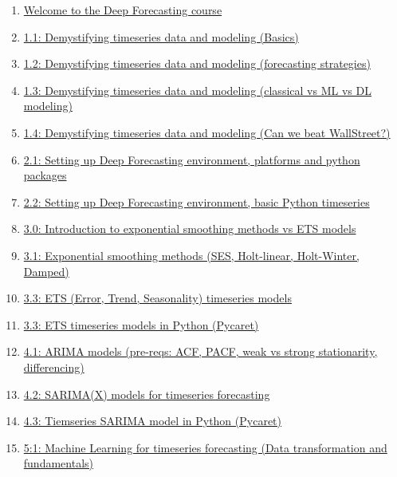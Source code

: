 \documentclass[11pt]{article}
\begin{document}
\begin{enumerate}
	\item \href{https://mp.weixin.qq.com/s/Dw8Xu_eGJykfd_i5t8Fp0Q}{Welcome to the Deep Forecasting course}	%
	\item \href{https://mp.weixin.qq.com/s/XLzZgcrwRD-jBh2YN8_7Cw}{1.1: Demystifying timeseries data and modeling (Basics)}	%
	\item \href{https://mp.weixin.qq.com/s/iXobt-0yxXSpGvpFLyzIGg}{1.2: Demystifying timeseries data and modeling (forecasting strategies)}	%
	\item \href{https://mp.weixin.qq.com/s/pLlfvW1QxU3d1BuqEknj9A}{1.3: Demystifying timeseries data and modeling (classical vs ML vs DL modeling)}	%
	\item \href{https://mp.weixin.qq.com/s/BvlmKRov7WUuIWgQuSuaCQ}{1.4: Demystifying timeseries data and modeling (Can we beat WallStreet?)}	%
	\item \href{https://mp.weixin.qq.com/s/urkU7I0B1g93b1t3AKfHFw}{2.1: Setting up Deep Forecasting environment, platforms and python packages}	%
	\item \href{https://mp.weixin.qq.com/s/nPmHgr0hgk9j0qPWvH0Bww}{2.2: Setting up Deep Forecasting environment, basic Python timeseries}	%
	\item \href{https://mp.weixin.qq.com/s/6DpsYTtRDw57rUlYbWEYng}{3.0: Introduction to exponential smoothing methods vs ETS models}	%
	\item \href{https://mp.weixin.qq.com/s/MUAjI51ok49KSlQCEEHWaA}{3.1: Exponential smoothing methods (SES, Holt-linear, Holt-Winter, Damped)}	%
	\item \href{https://mp.weixin.qq.com/s/IVPSV28FUjdZVoTt1U99wQ}{3.3: ETS (Error, Trend, Seasonality) timeseries models}	%
	\item \href{https://mp.weixin.qq.com/s/JimjQMjd0pK4YlnaEmP3eA}{3.3: ETS timeseries models in Python (Pycaret)}	%
	\item \href{https://mp.weixin.qq.com/s/okKOX2ckjDcFDqGYoH2YrQ}{4.1: ARIMA models (pre-reqs: ACF, PACF, weak vs strong stationarity, differencing)}	%
	\item \href{https://mp.weixin.qq.com/s/G8MpH-w7-2j4yoqYTBxGJA}{4.2: SARIMA(X) models for timeseries forecasting}	%
	\item \href{https://mp.weixin.qq.com/s/nRNiZ5Sf_XZcIgNimlcjpg}{4.3: Tiemseries SARIMA model in Python (Pycaret)}	%
	\item \href{https://mp.weixin.qq.com/s/ceVJW3KaQLkcxgIxJzDJ2g}{5:1: Machine Learning for timeseries forecasting (Data transformation and fundamentals)}	%

\end{enumerate}
\end{document}
